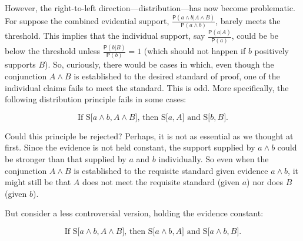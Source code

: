 \documentclass[10pt,dvipsnames,enabledeprecatedfontcommands]{scrartcl}
\newcommand{\et}{\wedge}
\newcommand{\pr}[1]{\mathsf{P}(#1)}
\begin{document}
However, the right-to-left direction---distribution---has now become
problematic. For suppose the combined evidential support,
\(\frac{\pr{a \et b | A \et B}}{\pr{a \et b}}\), barely meets the
threshold. This implies that the individual support, say
\(\frac{\pr{a |A}}{\pr{a}}\), could be be below the threshold unless
\(\frac{\pr{b |B}}{\pr{b}}=1\)
(which should not happen if \(b\) positively supports \(B\)). So,
curiously, there would be cases in which, even though the conjunction
\(A\et B\) is established to the desired standard of proof, one of the
individual claims fails to meet the standard. This is odd. More
specifically, the following distribution principle fails in some cases:

\[\text{If S[$a \wedge b, A\wedge B$], then S[$a, A$] and S[$b, B$].} \tag{DIS1}\]

\noindent
Could this principle be rejected? Perhaps, it is not as essential as we
thought at first. Since the evidence is not held constant, the support
supplied by \(a\wedge b\) could be stronger than that supplied by \(a\)
and \(b\) individually. So even when the conjunction \(A \wedge B\) is
established to the requisite standard given evidence \(a\wedge b\), it
might still be that \(A\) does not meet the requisite standard (given
\(a\)) nor does \(B\) (given \(b\)).

But consider a less controversial version, holding the evidence
constant:

\[\text{If S[$a \wedge b, A\wedge B$], then S[$a \wedge b, A$] and S[$a \wedge b, B$].} \tag{DIS2}\]
\end{document}
